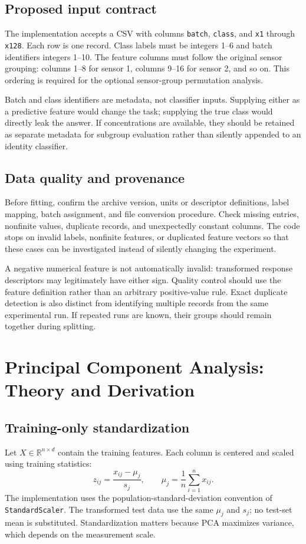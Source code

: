 \documentclass[11pt,a4paper]{article}
\newcommand{\sectionpage}[1]{\clearpage\section{#1}}
\begin{document}
\subsection{Proposed input contract}
The implementation accepts a CSV with columns \texttt{batch}, \texttt{class}, and \texttt{x1} through \texttt{x128}. Each row is one record. Class labels must be integers 1--6 and batch identifiers integers 1--10. The feature columns must follow the original sensor grouping: columns 1--8 for sensor 1, columns 9--16 for sensor 2, and so on. This ordering is required for the optional sensor-group permutation analysis.

Batch and class identifiers are metadata, not classifier inputs. Supplying either as a predictive feature would change the task; supplying the true class would directly leak the answer. If concentrations are available, they should be retained as separate metadata for subgroup evaluation rather than silently appended to an identity classifier.

\subsection{Data quality and provenance}
Before fitting, confirm the archive version, units or descriptor definitions, label mapping, batch assignment, and file conversion procedure. Check missing entries, nonfinite values, duplicate records, and unexpectedly constant columns. The code stops on invalid labels, nonfinite features, or duplicated feature vectors so that these cases can be investigated instead of silently changing the experiment.

A negative numerical feature is not automatically invalid: transformed response descriptors may legitimately have either sign. Quality control should use the feature definition rather than an arbitrary positive-value rule. Exact duplicate detection is also distinct from identifying multiple records from the same experimental run. If repeated runs are known, their groups should remain together during splitting.

\sectionpage{Principal Component Analysis: Theory and Derivation}
\subsection{Training-only standardization}
Let $X\in\mathbb R^{n\times d}$ contain the training features. Each column is centered and scaled using training statistics:
\begin{equation}
z_{ij}=\frac{x_{ij}-\mu_j}{s_j},\qquad
\mu_j=\frac{1}{n}\sum_{i=1}^n x_{ij}.
\end{equation}
The implementation uses the population-standard-deviation convention of \texttt{StandardScaler}. The transformed test data use the same $\mu_j$ and $s_j$; no test-set mean is substituted. Standardization matters because PCA maximizes variance, which depends on the measurement scale.
\end{document}
